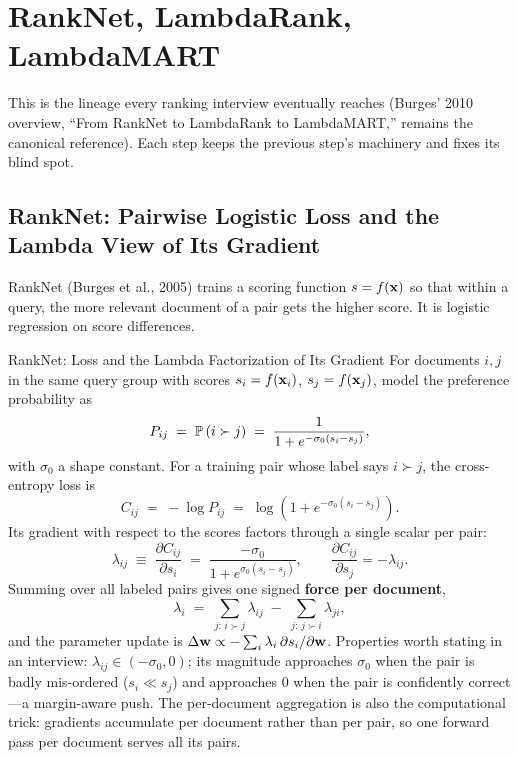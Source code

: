 \section{RankNet, LambdaRank, LambdaMART}
\label{sr:sec:lambda_family}

This is the lineage every ranking interview eventually reaches (Burges' 2010 overview, ``From RankNet to LambdaRank to LambdaMART,'' remains the canonical reference). Each step keeps the previous step's machinery and fixes its blind spot.

\subsection{RankNet: Pairwise Logistic Loss and the Lambda View of Its Gradient}

RankNet (Burges et al., 2005) trains a scoring function $s = f(\mathbf{x})$ so that within a query, the more relevant document of a pair gets the higher score. It is logistic regression on score differences.

\begin{mathresult}{RankNet: Loss and the Lambda Factorization of Its Gradient}
For documents $i, j$ in the same query group with scores $s_i = f(\mathbf{x}_i)$, $s_j = f(\mathbf{x}_j)$, model the preference probability as
\begin{equation}
P_{ij} \;=\; \mathbb{P}\left(i \succ j\right) \;=\; \frac{1}{1 + e^{-\sigma_0 (s_i - s_j)}},
\end{equation}
with $\sigma_0$ a shape constant. For a training pair whose label says $i \succ j$, the cross-entropy loss is
\begin{equation}
C_{ij} \;=\; -\log P_{ij} \;=\; \log\!\left(1 + e^{-\sigma_0 (s_i - s_j)}\right).
\end{equation}
Its gradient with respect to the scores factors through a single scalar per pair:
\begin{equation}
\lambda_{ij} \;\equiv\; \frac{\partial C_{ij}}{\partial s_i} \;=\; \frac{-\sigma_0}{1 + e^{\sigma_0 (s_i - s_j)}}, \qquad \frac{\partial C_{ij}}{\partial s_j} = -\lambda_{ij}.
\end{equation}
Summing over all labeled pairs gives one signed \textbf{force per document},
\begin{equation}
\lambda_i \;=\; \sum_{j:\, i \succ j} \lambda_{ij} \;-\; \sum_{j:\, j \succ i} \lambda_{ji},
\end{equation}
and the parameter update is $\Delta \mathbf{w} \propto -\sum_i \lambda_i\, \partial s_i / \partial \mathbf{w}$. Properties worth stating in an interview: $\lambda_{ij} \in (-\sigma_0, 0)$; its magnitude approaches $\sigma_0$ when the pair is badly mis-ordered ($s_i \ll s_j$) and approaches $0$ when the pair is confidently correct---a margin-aware push. The per-document aggregation is also the computational trick: gradients accumulate per document rather than per pair, so one forward pass per document serves all its pairs.
\end{mathresult}


